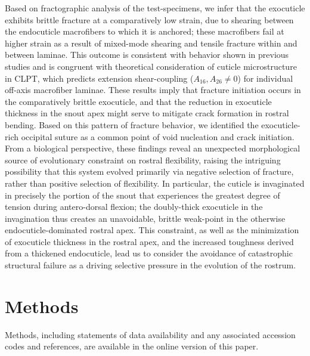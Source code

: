 \documentclass[twocolumn, linenumbers, superscriptaddress, nofootinbib]{revtex4-1}
\begin{document}
		Based on fractographic analysis of the test-specimens, we infer that the exocuticle exhibits brittle fracture at a comparatively low strain, due to shearing between the endocuticle macrofibers to which it is anchored; these macrofibers fail at higher strain as a result of mixed-mode shearing and tensile fracture within and between laminae.
		This outcome is consistent with behavior shown in previous studies and is congruent with theoretical consideration of cuticle microstructure in CLPT, which predicts extension shear-coupling ($A_{16}, A_{26}\neq{0}$) for individual off-axis macrofiber laminae.
		These results imply that fracture initiation occurs in the comparatively brittle exocuticle, and that the reduction in exocuticle thickness in the snout apex might serve to mitigate crack formation in rostral bending.
		Based on this pattern of fracture behavior, we identified the exocuticle-rich occipital suture as a common point of void nucleation and crack initiation.
		From a biological perspective, these findings reveal an unexpected morphological source of evolutionary constraint on rostral flexibility, raising the intriguing possibility that this system evolved primarily via negative selection of fracture, rather than positive selection of flexibility.
		In particular, the cuticle is invaginated in precisely the portion of the snout that experiences the greatest degree of tension during antero-dorsal flexion; the doubly-thick exocuticle in the invagination thus creates an unavoidable, brittle weak-point in the otherwise endocuticle-dominated rostral apex.
		This constraint, as well as the minimization of exocuticle thickness in the rostral apex, and the increased toughness derived from a thickened endocuticle, lead us to consider the avoidance of catastrophic structural failure as a driving selective pressure in the evolution of the rostrum.	
		
	\section{Methods}
		Methods, including statements of data availability and any associated accession codes and references, are available in the online version of this paper.
	
\end{document}

